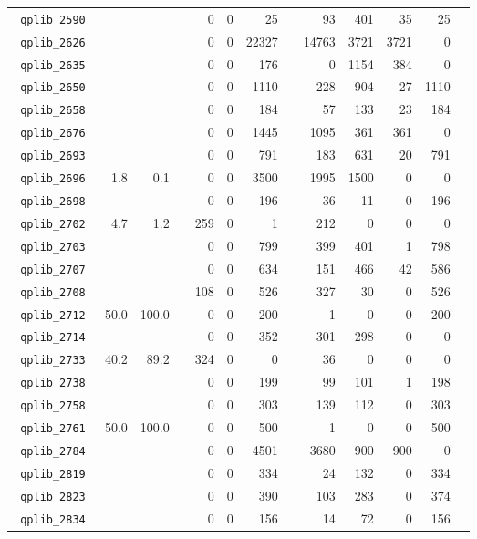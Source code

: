 {\begin{longtable}{lrrrrrrrrrrrr}
\texttt{ 	qplib\_2590	}	&		&		&	&	0	&	0	&	25	&	&	93	&	401	&	35	&	25	\\
\texttt{ 	qplib\_2626	}	&		&		&	&	0	&	0	&	22327	&	&	14763	&	3721	&	3721	&	0	\\
\texttt{ 	qplib\_2635	}	&		&		&	&	0	&	0	&	176	&	&	0	&	1154	&	384	&	0	\\
\texttt{ 	qplib\_2650	}	&		&		&	&	0	&	0	&	1110	&	&	228	&	904	&	27	&	1110	\\
\texttt{ 	qplib\_2658	}	&		&		&	&	0	&	0	&	184	&	&	57	&	133	&	23	&	184	\\
\texttt{ 	qplib\_2676	}	&		&		&	&	0	&	0	&	1445	&	&	1095	&	361	&	361	&	0	\\
\texttt{ 	qplib\_2693	}	&		&		&	&	0	&	0	&	791	&	&	183	&	631	&	20	&	791	\\
\texttt{ 	qplib\_2696	}	&	1.8	&	0.1	&	&	0	&	0	&	3500	&	&	1995	&	1500	&	0	&	0	\\
\texttt{ 	qplib\_2698	}	&		&		&	&	0	&	0	&	196	&	&	36	&	11	&	0	&	196	\\
\texttt{ 	qplib\_2702	}	&	4.7	&	1.2	&	&	259	&	0	&	1	&	&	212	&	0	&	0	&	0	\\
\texttt{ 	qplib\_2703	}	&		&		&	&	0	&	0	&	799	&	&	399	&	401	&	1	&	798	\\
\texttt{ 	qplib\_2707	}	&		&		&	&	0	&	0	&	634	&	&	151	&	466	&	42	&	586	\\
\texttt{ 	qplib\_2708	}	&		&		&	&	108	&	0	&	526	&	&	327	&	30	&	0	&	526	\\
\texttt{ 	qplib\_2712	}	&	50.0	&	100.0	&	&	0	&	0	&	200	&	&	1	&	0	&	0	&	200	\\
\texttt{ 	qplib\_2714	}	&		&		&	&	0	&	0	&	352	&	&	301	&	298	&	0	&	0	\\
\texttt{ 	qplib\_2733	}	&	40.2	&	89.2	&	&	324	&	0	&	0	&	&	36	&	0	&	0	&	0	\\
\texttt{ 	qplib\_2738	}	&		&		&	&	0	&	0	&	199	&	&	99	&	101	&	1	&	198	\\
\texttt{ 	qplib\_2758	}	&		&		&	&	0	&	0	&	303	&	&	139	&	112	&	0	&	303	\\
\texttt{ 	qplib\_2761	}	&	50.0	&	100.0	&	&	0	&	0	&	500	&	&	1	&	0	&	0	&	500	\\
\texttt{ 	qplib\_2784	}	&		&		&	&	0	&	0	&	4501	&	&	3680	&	900	&	900	&	0	\\
\texttt{ 	qplib\_2819	}	&		&		&	&	0	&	0	&	334	&	&	24	&	132	&	0	&	334	\\
\texttt{ 	qplib\_2823	}	&		&		&	&	0	&	0	&	390	&	&	103	&	283	&	0	&	374	\\
\texttt{ 	qplib\_2834	}	&		&		&	&	0	&	0	&	156	&	&	14	&	72	&	0	&	156	\\

\end{longtable}}
